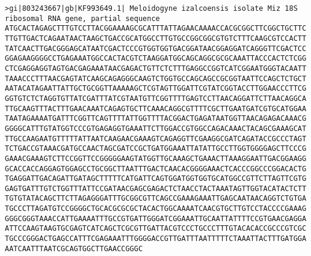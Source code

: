 \documentclass[11pt]{article}
\begin{document}
\begin{Verbatim}[commandchars=\\\{\}]
>gi|803243667|gb|KF993649.1| Meloidogyne izalcoensis isolate Miz 18S ribosomal RNA gene, partial sequence
ATGCACTAGAGCTTTGTCCTTACGGAAAAGCGCATTTATTAGAACAAAACCACGCGGCTTCGGCTGCTTC
TTGTTGACTCAGAATAACTAAGCTGACCGCATGGCCTTGTGCCGGCGGCGTGTCTTTCAAGCGTCCACTT
TATCAACTTGACGGGAGCATAATCGACTCCCGTGGTGGTGACGGATAACGGAGGATCAGGGTTCGACTCC
GGAGAAGGGGCCTGAGAAATGGCCACTACGTCTAAGGATGGCAGCAGGCGCGCAAATTACCCACTCTCGG
CTCGAGGAGGTAGTGACGAGAAATAACGAGACTGTTCTCTTTGAGGCCGGTCATCGGAATGGGTACAATT
TAAACCCTTTAACGAGTATCAAGCAGAGGGCAAGTCTGGTGCCAGCAGCCGCGGTAATTCCAGCTCTGCT
AATACATAGAATTATTGCTGCGGTTAAAAAGCTCGTAGTTGGATTCGTATCGGTACCTTGGAACCCTTCG
GGTGTCTCTAGGTGTTATCGATTTATCGTAATGTTCGGTTTTGAGTCCTTAACAGGATTCTTAACAGGCA
TTGCAAGTTTACTTTGAACAAATCAGAGTGCTTCAAACAGGCGTTTTCGCTTGAATGATCGTGCATGGAA
TAATAGAAAATGATTTCGGTTCAGTTTTATTGGTTTTACGGACTGAGATAATGGTTAACAGAGACAAACG
GGGGCATTTGTATGGTCCCGTGAGAGGTGAAATTCTTGGACCGTGGCCAGACAAACTACAGCGAAAGCAT
TTGCCAAGAATGTTTTTATTAATCAAGAACGAAAGTCAGAGGTTCGAAGGCGATCAGATACCGCCCTAGT
TCTGACCGTAAACGATGCCAACTAGCGATCCGCTGATGGAAATTATATTGCCTTGGTGGGGAGCTTCCCG
GAAACGAAAGTCTTCCGGTTCCGGGGGAAGTATGGTTGCAAAGCTGAAACTTAAAGGAATTGACGGAAGG
GCACCACCAGGAGTGGAGCCTGCGGCTTAATTTGACTCAACACGGGGAAACTCACCCGGCCCGGACACTG
TGAGGATTGACAGATTGATAGCTTTTTCATGATTCAGTGGATGGTGGTGCATGGCCGTTCTTAGTTCGTG
GAGTGATTTGTCTGGTTTATTCCGATAACGAGCGAGACTCTAACCTACTAAATAGTTGGTACATACTCTT
TGTGTATACAGCTTCTTAGAGGGATTTGCGGCGTTCAGCCGAAAGAAATTGAGCAATAACAGGTCTGTGA
TGCCCTTAGATGTCCGGGGCTGCACGCGCGCTACACTGGCAAAATCAACGTGCTTGTCCTACCCCGAAAG
GGGCGGGTAAACCATTGAAAATTTGCCGTGATTGGGATCGGAAATTGCAATTATTTTCCGTGAACGAGGA
ATTCCAAGTAAGTGCGAGTCATCAGCTCGCGTTGATTACGTCCCTGCCCTTTGTACACACCGCCCGTCGC
TGCCCGGGACTGAGCCATTTCGAGAAATTTGGGGACCGTTGATTTAATTTTTCTAAATTACTTTGATGGA
AATCAATTTAATCGCAGTGGCTTGAACCGGGC


\end{Verbatim}
\end{document}
